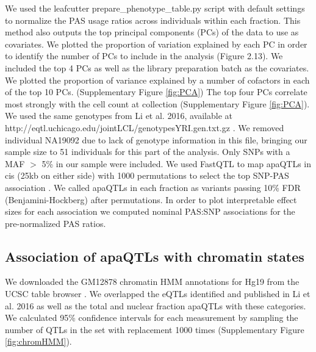 We used the leafcutter prepare\_phenotype\_table.py script with default settings to normalize the PAS usage ratios across individuals within each fraction. This method also outputs the top principal components (PCs) of the data to use as covariates. We plotted the proportion of variation explained by each PC in order to identify the number of PCs to include in the analysis (Figure 2.13). We included the top 4 PCs as well as the library preparation batch as the covariates. We plotted the proportion of variance explained by a number of cofactors in each of the top 10 PCs. (Supplementary Figure \ref{fig:PCA}) The top four PCs correlate most strongly with the cell count at collection (Supplementary Figure  \ref{fig:PCA}). We used the same genotypes from Li et al. 2016\citep{li_rna_2016}, available at http://eqtl.uchicago.edu/jointLCL/genotypesYRI.gen.txt.gz \citep{li_rna_2016}. We removed individual NA19092 due to lack of genotype information in this file, bringing our sample size to 51 individuals for this part of the analysis. Only SNPs with a MAF $>$ 5\% in our sample were included. We used FastQTL to map apaQTLs in cis (25kb on either side) with 1000 permutations to select the top SNP-PAS association \citep{ongen_fast_2016}. We called apaQTLs in each fraction as variants passing 10\% FDR (Benjamini-Hockberg) after permutations. In order to plot interpretable effect sizes for each association we computed nominal PAS:SNP associations for the pre-normalized PAS ratios.


\subsection{Association of apaQTLs with chromatin states}\label{Association-of-apaQTLs-with-chromatin-state}

We downloaded the GM12878 chromatin HMM annotations for Hg19 from the UCSC table browser \citep{kent_human_2002}. We overlapped the eQTLs identified and published in Li et al. 2016\citep{li_rna_2016} as well as the total and nuclear fraction apaQTLs with these categories. We calculated 95\% confidence intervals for each measurement by sampling the number of QTLs in the set with replacement 1000 times (Supplementary Figure  \ref{fig:chromHMM}). 


